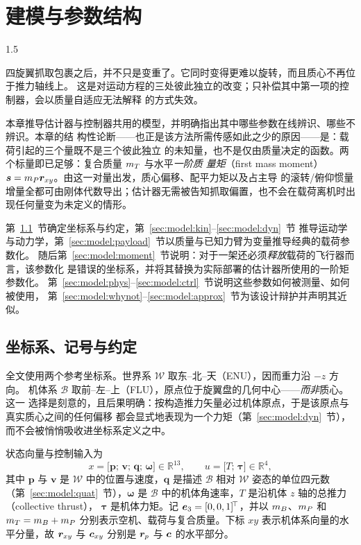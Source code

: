 
\chapter{建模与参数结构}
\label{ch:model-zh}
\begin{spacing}{1.5}
\setlength{\parskip}{0.22in}

四旋翼抓取包裹之后，并不只是变重了。它同时变得更难以旋转，而且质心不再位于推力轴线上。
这是对运动方程的三处彼此独立的改变；只补偿其中第一项的控制器，会以质量自适应无法解释
的方式失效。

本章推导估计器与控制器共用的模型，并明确指出其中哪些参数在线辨识、哪些不辨识。本章的结
构性论断——也正是该方法所需传感如此之少的原因——是：载荷引起的三个量既不是三个彼此独立
的未知量，也不是仅由质量决定的函数。两个标量即已足够：复合质量 $m_T$ 与水平\emph{一阶质
量矩}（first mass moment）$\bm{s}=m_P\bm{r}_{xy}$。由这一对量出发，质心偏移、配平力矩以及占主导
的滚转/俯仰惯量增量全都可由刚体代数导出；估计器无需被告知抓取偏置，也不会在载荷离机时出
现任何量变为未定义的情形。

第~\ref{sec:model:frames}~节确定坐标系与约定，第~\ref{sec:model:kin}--\ref{sec:model:dyn}~节
推导运动学与动力学，第~\ref{sec:model:payload}~节以质量与已知力臂为变量推导经典的载荷参数化。
随后第~\ref{sec:model:moment}~节说明：对于一架还必须\emph{释放}载荷的飞行器而言，该参数化
是错误的坐标系，并将其替换为实际部署的估计器所使用的一阶矩参数化。
第~\ref{sec:model:phys}--\ref{sec:model:ctrl}~节说明这些参数如何被测量、如何被使用，
第~\ref{sec:model:whynot}--\ref{sec:model:approx}~节为该设计辩护并声明其近似。

\section{坐标系、记号与约定}\label{sec:model:frames}

全文使用两个参考坐标系。世界系 $\mathcal{W}$ 取东--北--天（ENU），因而重力沿 $-z$ 方向。
机体系 $\mathcal{B}$ 取前--左--上（FLU），原点位于旋翼盘的几何中心——\emph{而非}质心。这一
选择是刻意的，且后果明确：按构造推力矢量必过机体原点，于是该原点与真实质心之间的任何偏移
都会显式地表现为一个力矩（第~\ref{sec:model:dyn}~节），而不会被悄悄吸收进坐标系定义之中。

状态向量与控制输入为
\begin{equation}
x = \bigl[\bm{p};\, \bm{v};\, \bm{q};\, \bm{\omega}\bigr] \in \mathbb{R}^{13},
\qquad
u = \bigl[T;\, \bm{\tau}\bigr] \in \mathbb{R}^{4},
\label{eq:state}
\end{equation}
其中 $\bm{p}$ 与 $\bm{v}$ 是 $\mathcal{W}$ 中的位置与速度，$\bm{q}$ 是描述 $\mathcal{B}$
相对 $\mathcal{W}$ 姿态的单位四元数（第~\ref{sec:model:quat}~节），$\bm{\omega}$ 是
$\mathcal{B}$ 中的机体角速率，$T$ 是沿机体 $z$ 轴的总推力（collective thrust），
$\bm{\tau}$ 是机体力矩。记 $\bm{e}_3 = [0,0,1]^{\!\top}$，并以 $m_B$、$m_P$ 和
$m_T=m_B+m_P$ 分别表示空机、载荷与复合质量。下标 $xy$ 表示机体系向量的水平分量，故
$\bm{r}_{xy}$ 与 $\bm{c}_{xy}$ 分别是 $\bm{r}_p$ 与 $\bm{c}$ 的水平部分。


\end{spacing}
